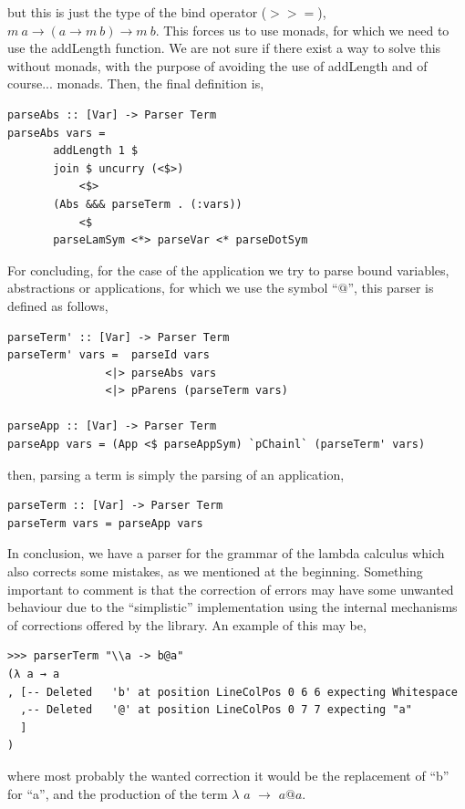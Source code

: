 \documentclass[a4paper,10pt]{article}
\begin{document}
but this is just the type of the bind operator ($>>=$), $m \ a \rightarrow (a \rightarrow m \ b) \rightarrow m \ b$. This forces us to use monads, for which we need to use the addLength function.
We are not sure if there exist a way to solve this without monads, with the purpose of avoiding the
use of addLength and of course... monads. Then, the final definition is,

\begin{lstlisting}
parseAbs :: [Var] -> Parser Term
parseAbs vars = 
       addLength 1 $
       join $ uncurry (<$>) 
           <$> 
       (Abs &&& parseTerm . (:vars))
       	   <$ 
       parseLamSym <*> parseVar <* parseDotSym
\end{lstlisting}

For concluding, for the case of the application we try to parse bound variables, abstractions
or applications, for which we use the symbol ``$@$'', this parser is defined as follows,

\begin{lstlisting}
parseTerm' :: [Var] -> Parser Term
parseTerm' vars =  parseId vars
               <|> parseAbs vars
               <|> pParens (parseTerm vars)

parseApp :: [Var] -> Parser Term
parseApp vars = (App <$ parseAppSym) `pChainl` (parseTerm' vars)
\end{lstlisting}

then, parsing a term is simply the parsing of an application,

\begin{lstlisting}
parseTerm :: [Var] -> Parser Term
parseTerm vars = parseApp vars
\end{lstlisting}

In conclusion, we have a parser for the grammar of the lambda calculus which also corrects some
mistakes, as we mentioned at the beginning. Something important to comment is that the
correction of errors may have some unwanted behaviour due to the ``simplistic''
implementation using the internal mechanisms of corrections offered by the library. An example
of this may be,

\begin{verbatim}
>>> parserTerm "\\a -> b@a"
(λ a → a
, [-- Deleted   'b' at position LineColPos 0 6 6 expecting Whitespace
  ,-- Deleted   '@' at position LineColPos 0 7 7 expecting "a"
  ]
)
\end{verbatim}

where most probably the wanted correction it would be the replacement of ``b'' for
``a'', and the production of the term $\lambda$ $a$ $\rightarrow$ $a@a$.
\end{document}
